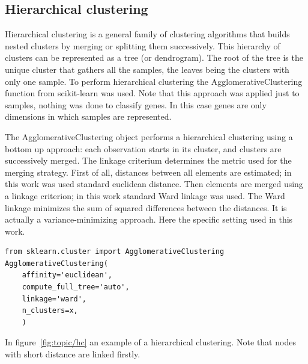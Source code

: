 \subsection{Hierarchical clustering}\label{sec:hc}
Hierarchical clustering is a general family of clustering algorithms that builds nested clusters by merging or splitting them successively. This hierarchy of clusters can be represented as a tree (or dendrogram). The root of the tree is the unique cluster that gathers all the samples, the leaves being the clusters with only one sample. To perform hierarchical clustering the AgglomerativeClustering function from scikit-learn was used. Note that this approach was applied just to samples, nothing was done to classify genes. In this case genes are only dimensions in which samples are represented.

The AgglomerativeClustering object performs a hierarchical clustering using a bottom up approach: each observation starts in its cluster, and clusters are successively merged. The linkage criterium determines the metric used for the merging strategy. 
First of all, distances between all elements are estimated; in this work was used standard euclidean distance. Then elements are merged using a linkage criterion; in this work standard Ward linkage was used. The Ward linkage minimizes the sum of squared differences between the distances. It is actually a variance-minimizing approach. Here the specific setting used in this work.
\begin{lstlisting}[style=mypython]
from sklearn.cluster import AgglomerativeClustering
AgglomerativeClustering(
    affinity='euclidean',
    compute_full_tree='auto',
    linkage='ward',
    n_clusters=x,
    )
\end{lstlisting}
In figure~\ref{fig:topic/hc} an example of a hierarchical clustering. Note that nodes with short distance are linked firstly.
